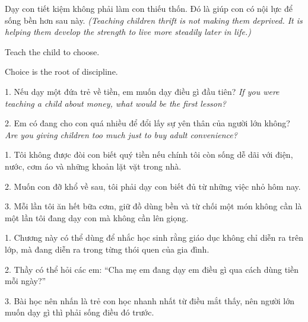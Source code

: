 \begin{baihoc}
Dạy con tiết kiệm không phải làm con thiếu thốn. Đó là giúp con có nội lực để sống bền hơn sau này.
\textit{(Teaching children thrift is not making them deprived. It is helping them develop the strength to live more steadily later in life.)}
\end{baihoc}

\begin{ghinhoanh}
Teach the child to choose.

Choice is the root of discipline.
\end{ghinhoanh}

\begin{tuhocnhanh}
1. Nếu dạy một đứa trẻ về tiền, em muốn dạy điều gì đầu tiên? \textit{If you were teaching a child about money, what would be the first lesson?}

2. Em có đang cho con quá nhiều để đổi lấy sự yên thân của người lớn không? \textit{Are you giving children too much just to buy adult convenience?}
\end{tuhocnhanh}

\begin{turanminh}
1. Tôi không được đòi con biết quý tiền nếu chính tôi còn sống dễ dãi với điện, nước, cơm áo và những khoản lặt vặt trong nhà.

2. Muốn con đỡ khổ về sau, tôi phải dạy con biết đủ từ những việc nhỏ hôm nay.

3. Mỗi lần tôi ăn hết bữa cơm, giữ đồ dùng bền và từ chối một món không cần là một lần tôi đang dạy con mà không cần lên giọng.
\end{turanminh}

\begin{dayhoc}
1. Chương này có thể dùng để nhắc học sinh rằng giáo dục không chỉ diễn ra trên lớp, mà đang diễn ra trong từng thói quen của gia đình.

2. Thầy có thể hỏi các em: ``Cha mẹ em đang dạy em điều gì qua cách dùng tiền mỗi ngày?''

3. Bài học nên nhấn là trẻ con học nhanh nhất từ điều mắt thấy, nên người lớn muốn dạy gì thì phải sống điều đó trước.
\end{dayhoc}